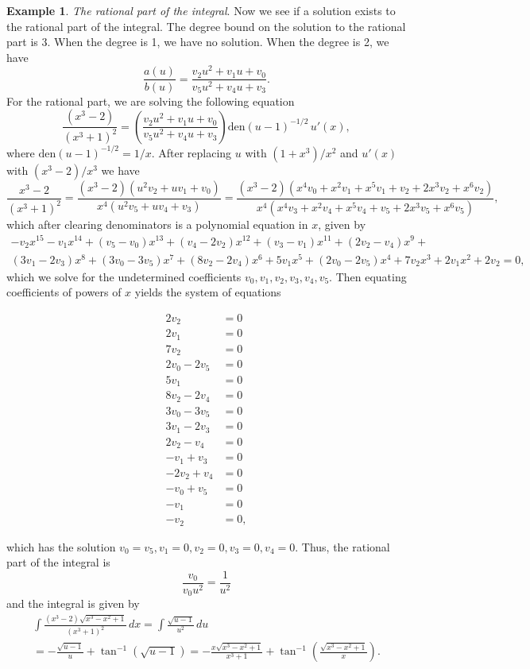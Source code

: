 \documentclass[12pt]{article}
\numberwithin{equation}{section}
\theoremstyle{definition}
\newtheorem{example}{Example}[section]
\begin{document}
\begin{example}
\noindent\textit{The rational part of the integral}. Now we see if a solution exists to the 
rational part of the integral. The degree bound on the solution to the rational part 
is 3. When the degree is 1, we have no solution. When the degree is 2, we have
$$\frac{a(u)}{b(u)}=\frac{v_2u^2+v_1u+v_0}{v_5u^2+v_4u+v_3}.$$
For the rational part, we are solving the following equation
$$\frac{\left(x^3-2\right)}{\left(x^3+1\right)^2} = 
	\left(\frac{v_2u^2+v_1u+v_0}{v_5u^2+v_4u+v_3}\right)\text{den}(u-1)^{-1/2}\,u'(x),$$
where $\text{den}(u-1)^{-1/2}=1/x$. After replacing $u$ with $\left(1+x^3\right)/x^2$ and 
$u'(x)$ with $\left(x^3-2\right)/x^3$ we have
$$\frac{x^3-2}{\left(x^3+1\right)^2}=
\frac{\left(x^3-2\right) \left(u^2 v_2+u v_1+v_0\right)}{x^4 \left(u^2 v_5+u v_4+v_3\right)}=
\frac{\left(x^3-2\right)\left(x^4 v_0+x^2 v_1+x^5 v_1+v_2+2 x^3 v_2+x^6 v_2\right)}{x^4 \left(x^4 v_3+x^2 v_4+x^5 v_4+v_5+2 x^3 v_5+x^6 v_5\right)},$$
which after clearing denominators is a polynomial equation in $x$, given by
\begin{multline*}
-v_2 x^{15}-v_1 x^{14}+\left(v_5-v_0\right) x^{13}+\left(v_4-2 v_2\right) x^{12}
+\left(v_3-v_1\right) x^{11}+\left(2 v_2-v_4\right) x^9+ \\
\left(3v_1-2 v_3\right) x^8+\left(3 v_0-3 v_5\right) x^7+
\left(8 v_2-2 v_4\right) x^6+5 v_1 x^5+\left(2 v_0-2 v_5\right) x^4+7 v_2 x^3+2 v_1 x^2+2 v_2=0,
\end{multline*}
which we solve for the undetermined coefficients $v_0,v_1,v_2,v_3,v_4,v_5$. Then equating coefficients of powers of $x$ yields the system of equations

\begin{align*}
 2 v_2&=0 \\
 2 v_1&=0 \\
 7 v_2&=0 \\
 2 v_0-2 v_5&=0 \\
 5 v_1&=0 \\
 8 v_2-2 v_4&=0 \\
 3 v_0-3 v_5&=0 \\
 3 v_1-2 v_3&=0 \\
 2 v_2-v_4&=0 \\
 -v_1+v_3&=0 \\
 -2 v_2+v_4&=0 \\
 -v_0+v_5&=0 \\
 -v_1&=0 \\
 -v_2&=0,
\end{align*}

which has the solution $v_0=v_5,v_1=0,v_2=0,v_3=0,v_4=0$. Thus, the rational part of the integral is
$$\frac{v_0}{v_0u^2}=\frac{1}{u^2}$$
and the integral is given by 
\begin{multline*}
\int \frac{\left(x^3-2\right) \sqrt{x^3-x^2+1}}{\left(x^3+1\right)^2} \, dx 
=\int \frac{\sqrt{u-1}}{u^2} \, du \\
=-\frac{\sqrt{u-1}}{u}+\tan ^{-1}\left(\sqrt{u-1}\right)
=-\frac{x\sqrt{x^3-x^2+1}}{x^3+1}+\tan ^{-1}\left(\frac{\sqrt{x^3-x^2+1}}{x}\right).\\
\end{multline*}
\end{example}
\end{document}

